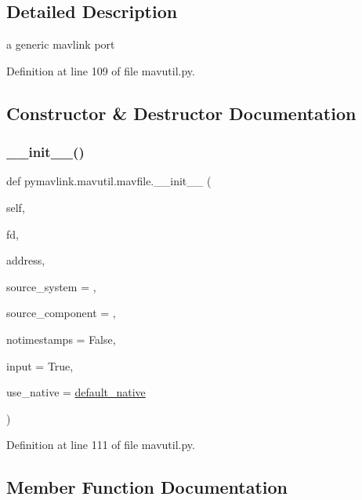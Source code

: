 \subsection{Detailed Description}
\begin{DoxyVerb}a generic mavlink port\end{DoxyVerb}
 

Definition at line 109 of file mavutil.\+py.



\subsection{Constructor \& Destructor Documentation}
\mbox{\label{classpymavlink_1_1mavutil_1_1mavfile_aa1179c2610a2cb4af6884cb853da74ec}} 
\subsubsection{\texorpdfstring{\_\_init\_\_()}{\_\_init\_\_()}}
{\footnotesize\ttfamily def pymavlink.\+mavutil.\+mavfile.\+\_\+\+\_\+init\+\_\+\+\_\+ (\begin{DoxyParamCaption}\item[{}]{self,  }\item[{}]{fd,  }\item[{}]{address,  }\item[{}]{source\+\_\+system = {},  }\item[{}]{source\+\_\+component = {},  }\item[{}]{notimestamps = {\ttfamily False},  }\item[{}]{input = {\ttfamily True},  }\item[{}]{use\+\_\+native = {\ttfamily \mbox{\hyperlink{namespacepymavlink_1_1mavutil_a21ce9da7b698a7bc21c44b9f77341b62}{default\+\_\+native}}} }\end{DoxyParamCaption})}



Definition at line 111 of file mavutil.\+py.



\subsection{Member Function Documentation}
\mbox{\label{classpymavlink_1_1mavutil_1_1mavfile_ab9d8c0609102dc488eeb537a2d1c94fe}} 
